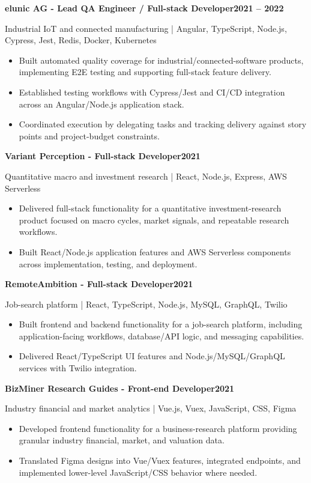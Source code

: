 \documentclass[10pt,a4paper]{article}
\newcommand{\client}[3]{%
  \needspace{4\baselineskip}%
  \vspace{3pt}%
  {\bfseries #1}\hfill{\small\bfseries #2}\par
  {\small\color{muted} #3}\par
}
\begin{document}
\client{elunic AG - Lead QA Engineer / Full-stack Developer}{2021 -- 2022}{Industrial IoT and connected manufacturing | Angular, TypeScript, Node.js, Cypress, Jest, Redis, Docker, Kubernetes}
\begin{itemize}
  \item Built automated quality coverage for industrial/connected-software products, implementing E2E testing and supporting full-stack feature delivery.
  \item Established testing workflows with Cypress/Jest and CI/CD integration across an Angular/Node.js application stack.
  \item Coordinated execution by delegating tasks and tracking delivery against story points and project-budget constraints.
\end{itemize}

\client{Variant Perception - Full-stack Developer}{2021}{Quantitative macro and investment research | React, Node.js, Express, AWS Serverless}
\begin{itemize}
  \item Delivered full-stack functionality for a quantitative investment-research product focused on macro cycles, market signals, and repeatable research workflows.
  \item Built React/Node.js application features and AWS Serverless components across implementation, testing, and deployment.
\end{itemize}

\client{RemoteAmbition - Full-stack Developer}{2021}{Job-search platform | React, TypeScript, Node.js, MySQL, GraphQL, Twilio}
\begin{itemize}
  \item Built frontend and backend functionality for a job-search platform, including application-facing workflows, database/API logic, and messaging capabilities.
  \item Delivered React/TypeScript UI features and Node.js/MySQL/GraphQL services with Twilio integration.
\end{itemize}

\client{BizMiner Research Guides - Front-end Developer}{2021}{Industry financial and market analytics | Vue.js, Vuex, JavaScript, CSS, Figma}
\begin{itemize}
  \item Developed frontend functionality for a business-research platform providing granular industry financial, market, and valuation data.
  \item Translated Figma designs into Vue/Vuex features, integrated endpoints, and implemented lower-level JavaScript/CSS behavior where needed.
\end{itemize}
\end{document}
